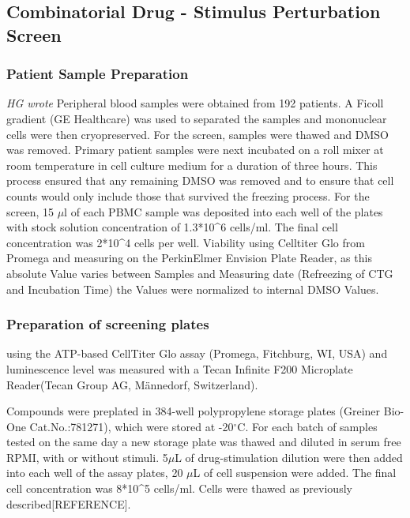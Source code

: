 \documentclass[11pt, a4paper, twosided]{book}
\begin{document}
\hypertarget{combinatorial-drug---stimulus-perturbation-screen}{%
\subsection{Combinatorial Drug - Stimulus Perturbation Screen}\label{combinatorial-drug---stimulus-perturbation-screen}}

\hypertarget{patient-sample-preparation}{%
\subsubsection{Patient Sample Preparation}\label{patient-sample-preparation}}

\emph{HG wrote}
Peripheral blood samples were obtained from 192 patients. A Ficoll gradient (GE Healthcare) was used to separated the samples and mononuclear cells were then cryopreserved. For the screen, samples were thawed and DMSO was removed. Primary patient samples were next incubated on a roll mixer at room temperature in cell culture medium for a duration of three hours. This process ensured that any remaining DMSO was removed and to ensure that cell counts would only include those that survived the freezing process. For the screen, 15 \(\mu\)l of each PBMC sample was deposited into each well of the plates with stock solution concentration of 1.3*10\^{}6 cells/ml. The final cell concentration was 2*10\^{}4 cells per well.
Viability using Celltiter Glo from Promega and measuring on the PerkinElmer Envision Plate Reader, as this absolute Value varies between Samples and Measuring date (Refreezing of CTG and Incubation Time) the Values were normalized to internal DMSO Values.

\hypertarget{preparation-of-screening-plates}{%
\subsubsection{Preparation of screening plates}\label{preparation-of-screening-plates}}

using the ATP-based CellTiter Glo assay (Promega, Fitchburg, WI, USA) and luminescence level was measured with a Tecan Infinite F200 Microplate Reader(Tecan Group AG, Männedorf, Switzerland).

Compounds were preplated in 384-well polypropylene storage plates (Greiner Bio-One Cat.No.:781271), which were stored at -20\(^\circ\)C. For each batch of samples tested on the same day a new storage plate was thawed and diluted in serum free RPMI, with or without stimuli. 5\(\mu\)L of drug-stimulation dilution were then added into each well of the assay plates, 20 \(\mu\)L of cell suspension were added. The final cell concentration was 8*10\^{}5 cells/ml. Cells were thawed as previously described{[}REFERENCE{]}.
\end{document}
